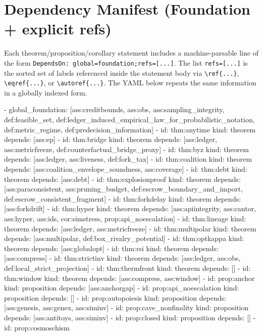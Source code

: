 \documentclass[11pt,a4paper]{article}
\theoremstyle{definition}
\theoremstyle{remark}
\begin{document}

\section*{Dependency Manifest (Foundation + explicit refs)}
\noindent Each theorem/proposition/corollary statement includes a machine-parsable line of the form
\texttt{DependsOn: }\nolinkurl{global=foundation;refs=[...]}.
The list \nolinkurl{refs=[...]} is the sorted set of labels referenced inside the statement body via \texttt{\textbackslash ref\{...\}}, \texttt{\textbackslash eqref\{...\}}, or \texttt{\textbackslash autoref\{...\}}.
The YAML below repeats the same information in a globally indexed form.

\begin{YAML}
- global_foundation: [ass:creditbounds, ass:obs, ass:sampling_integrity, def:feasible_set, def:ledger_induced_empirical_law_for_probabilistic_notation, def:metric_regime, def:predecision_information]
- id: thm:anytime
  kind: theorem
  depends: [ass:ep]
- id: thm:bridge
  kind: theorem
  depends: [ass:ledger, ass:metricfreeze, def:counterfactual_bridge_proxy]
- id: thm:byz
  kind: theorem
  depends: [ass:ledger, ass:liveness, def:fork_tax]
- id: thm:coalition
  kind: theorem
  depends: [ass:coalition_envelope_soundness, ass:coverage]
- id: thm:debt
  kind: theorem
  depends: [ass:debt]
- id: thm:explosionproof
  kind: theorem
  depends: [ass:paraconsistent, ass:pruning_budget, def:escrow_boundary_and_import, def:escrow_consistent_fragment]
- id: thm:forkdelay
  kind: theorem
  depends: [ass:forkdrift]
- id: thm:hyper
  kind: theorem
  depends: [ass:apiintegrity, ass:cantor, ass:hyper, ass:ids, cor:simstress, prop:api_noescalation]
- id: thm:lineage
  kind: theorem
  depends: [ass:ledger, ass:metricfreeze]
- id: thm:multipolar
  kind: theorem
  depends: [ass:multipolar, def:box_rivalry_potential]
- id: thm:optkappa
  kind: theorem
  depends: [ass:globalopt]
- id: thm:rsi
  kind: theorem
  depends: [ass:compress]
- id: thm:strictinv
  kind: theorem
  depends: [ass:ledger, ass:obs, def:local_strict_projection]
- id: thm:thermfront
  kind: theorem
  depends: []
- id: thm:window
  kind: theorem
  depends: [ass:compress, ass:window]
- id: prop:anchor
  kind: proposition
  depends: [ass:anchorgap]
- id: prop:api_noescalation
  kind: proposition
  depends: []
- id: prop:autopoiesis
  kind: proposition
  depends: [ass:genesis, ass:genex, ass:siminv]
- id: prop:cave_nonfinality
  kind: proposition
  depends: [ass:antitoys, ass:siminv]
- id: prop:closed
  kind: proposition
  depends: []
- id: prop:cosmoschism

\end{YAML}
\end{document}
